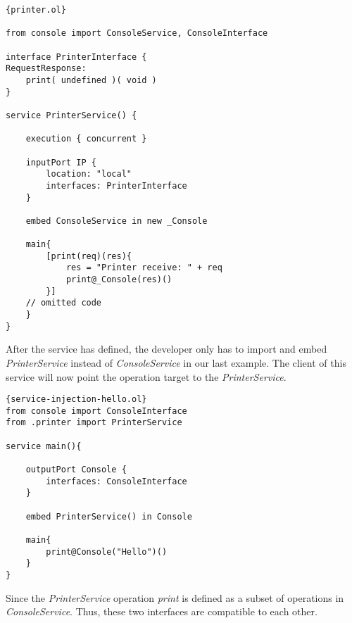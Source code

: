 \begin{listing}[H]
    \lstset{language=Jolie,
        style=codeStyle,
        numbers=left,
        firstnumber=1
    }
    \begin{lstlisting}[frame=tlrb,
basicstyle=\footnotesize]{printer.ol}

from console import ConsoleService, ConsoleInterface

interface PrinterInterface {
RequestResponse:
    print( undefined )( void )
}

service PrinterService() {

    execution { concurrent }
    
    inputPort IP {
        location: "local"
        interfaces: PrinterInterface
    }

    embed ConsoleService in new _Console

    main{
        [print(req)(res){
            res = "Printer receive: " + req
            print@_Console(res)()
        }]
	// omitted code
    }
}

\end{lstlisting}

\end{listing}

After the service has defined, the developer only has to import and embed \textit{PrinterService} instead of \textit{ConsoleService} in our last example. The client of this service will now point the operation target to the \textit{PrinterService}.

\begin{listing}[H]
    \lstset{language=Jolie,
        style=codeStyle,
        numbers=left,
        firstnumber=1
    }
    \begin{lstlisting}[frame=tlrb,
basicstyle=\footnotesize]{service-injection-hello.ol}
from console import ConsoleInterface
from .printer import PrinterService

service main(){

    outputPort Console {
        interfaces: ConsoleInterface
    }

    embed PrinterService() in Console

    main{
        print@Console("Hello")()
    }
}
\end{lstlisting}
\end{listing}

Since the \textit{PrinterService} operation \textit{print} is defined as a subset of operations in \textit{ConsoleService}. Thus, these two interfaces are compatible to each other.

